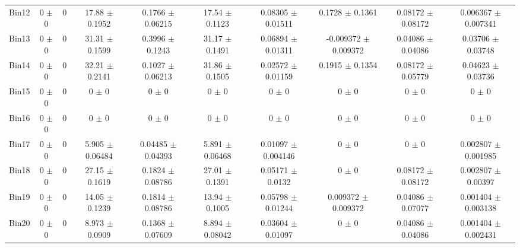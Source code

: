 \begin{tabular}{@{\extracolsep{4pt}}lccccccccc@{}}
     Bin12 & 0 $\pm$ 0 & 0 & 17.88 $\pm$ 0.1952 & 0.1766 $\pm$ 0.06215 & 17.54 $\pm$ 0.1123 & 0.08305 $\pm$ 0.01511 & 0.1728 $\pm$ 0.1361 & 0.08172 $\pm$ 0.08172 & 0.006367 $\pm$ 0.007341 \\ 
     Bin13 & 0 $\pm$ 0 & 0 & 31.31 $\pm$ 0.1599 & 0.3996 $\pm$ 0.1243 & 31.17 $\pm$ 0.1491 & 0.06894 $\pm$ 0.01311 & -0.009372 $\pm$ 0.009372 & 0.04086 $\pm$ 0.04086 & 0.03706 $\pm$ 0.03748 \\ 
     Bin14 & 0 $\pm$ 0 & 0 & 32.21 $\pm$ 0.2141 & 0.1027 $\pm$ 0.06213 & 31.86 $\pm$ 0.1505 & 0.02572 $\pm$ 0.01159 & 0.1915 $\pm$ 0.1354 & 0.08172 $\pm$ 0.05779 & 0.04623 $\pm$ 0.03736 \\ 
     Bin15 & 0 $\pm$ 0 & 0 & 0 $\pm$ 0 & 0 $\pm$ 0 & 0 $\pm$ 0 & 0 $\pm$ 0 & 0 $\pm$ 0 & 0 $\pm$ 0 & 0 $\pm$ 0 \\ 
     Bin16 & 0 $\pm$ 0 & 0 & 0 $\pm$ 0 & 0 $\pm$ 0 & 0 $\pm$ 0 & 0 $\pm$ 0 & 0 $\pm$ 0 & 0 $\pm$ 0 & 0 $\pm$ 0 \\ 
     Bin17 & 0 $\pm$ 0 & 0 & 5.905 $\pm$ 0.06484 & 0.04485 $\pm$ 0.04393 & 5.891 $\pm$ 0.06468 & 0.01097 $\pm$ 0.004146 & 0 $\pm$ 0 & 0 $\pm$ 0 & 0.002807 $\pm$ 0.001985 \\ 
     Bin18 & 0 $\pm$ 0 & 0 & 27.15 $\pm$ 0.1619 & 0.1824 $\pm$ 0.08786 & 27.01 $\pm$ 0.1391 & 0.05171 $\pm$ 0.0132 & 0 $\pm$ 0 & 0.08172 $\pm$ 0.08172 & 0.002807 $\pm$ 0.00397 \\ 
     Bin19 & 0 $\pm$ 0 & 0 & 14.05 $\pm$ 0.1239 & 0.1814 $\pm$ 0.08786 & 13.94 $\pm$ 0.1005 & 0.05798 $\pm$ 0.01244 & 0.009372 $\pm$ 0.009372 & 0.04086 $\pm$ 0.07077 & 0.001404 $\pm$ 0.003138 \\ 
     Bin20 & 0 $\pm$ 0 & 0 & 8.973 $\pm$ 0.0909 & 0.1368 $\pm$ 0.07609 & 8.894 $\pm$ 0.08042 & 0.03604 $\pm$ 0.01097 & 0 $\pm$ 0 & 0.04086 $\pm$ 0.04086 & 0.001404 $\pm$ 0.002431 \\ 
\hline\hline
  \end{tabular}
